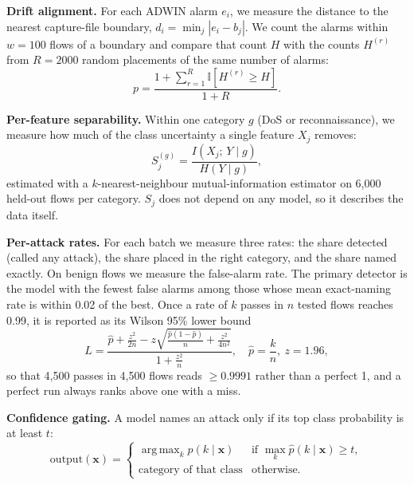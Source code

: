 \documentclass[conference]{IEEEtran}
\DeclareMathOperator*{\argmax}{arg\,max}
\begin{document}
\textbf{Drift alignment.} For each ADWIN alarm $e_i$, we measure the distance to the nearest capture-file boundary, $d_i = \min_j |e_i - b_j|$. We count the alarms within $w = 100$ flows of a boundary and compare that count $H$ with the counts $H^{(r)}$ from $R = 2000$ random placements of the same number of alarms:
\begin{equation}
p = \frac{1 + \sum_{r=1}^{R}\mathbb{I}\left[H^{(r)} \ge H\right]}{1 + R}.
\label{eq:pvalue}
\end{equation}

\textbf{Per-feature separability.} Within one category $g$ (DoS or reconnaissance), we measure how much of the class uncertainty a single feature $X_j$ removes:
\begin{equation}
S_j^{(g)} = \frac{I\left(X_j;\,Y \mid g\right)}{H\left(Y \mid g\right)},
\label{eq:sep}
\end{equation}
estimated with a $k$-nearest-neighbour mutual-information estimator \cite{b17} on 6,000 held-out flows per category. $S_j$ does not depend on any model, so it describes the data itself.

\textbf{Per-attack rates.} For each batch we measure three rates: the share detected (called any attack), the share placed in the right category, and the share named exactly. On benign flows we measure the false-alarm rate. The primary detector is the model with the fewest false alarms among those whose mean exact-naming rate is within 0.02 of the best. Once a rate of $k$ passes in $n$ tested flows reaches 0.99, it is reported as its Wilson 95\% lower bound
\begin{equation}
L = \frac{\hat p + \frac{z^2}{2n} - z\sqrt{\frac{\hat p(1-\hat p)}{n} + \frac{z^2}{4n^2}}}{1 + \frac{z^2}{n}}, \quad \hat p = \frac{k}{n},\ z = 1.96,
\label{eq:wilson}
\end{equation}
so that 4,500 passes in 4,500 flows reads $\ge 0.9991$ rather than a perfect 1, and a perfect run always ranks above one with a miss.

\textbf{Confidence gating.} A model names an attack only if its top class probability is at least $t$:
\begin{equation}
\text{output}(\mathbf{x}) =
\begin{cases}
\argmax_k \hat{p}(k\mid\mathbf{x}) & \text{if } \max_k \hat{p}(k\mid\mathbf{x}) \ge t,\\
\text{category of that class} & \text{otherwise.}
\end{cases}
\label{eq:gate}
\end{equation}
\end{document}
